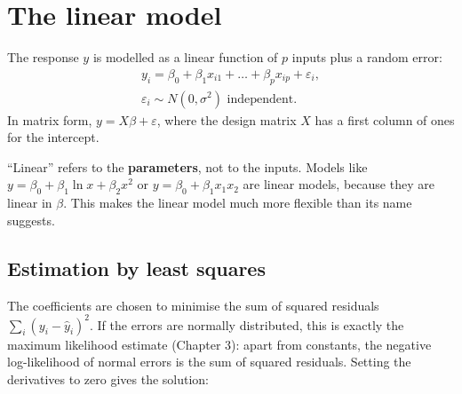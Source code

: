 \documentclass[
  letterpaper,
  DIV=11,
  numbers=noendperiod]{scrreprt}
\begin{document}
\section{The linear model}\label{the-linear-model}

\begin{tcolorbox}[enhanced jigsaw, left=2mm, title=\textcolor{quarto-callout-note-color}{\faInfo}\hspace{0.5em}{Definition: Multiple linear regression}, opacityback=0, breakable, rightrule=.15mm, arc=.35mm, toptitle=1mm, colbacktitle=quarto-callout-note-color!10!white, opacitybacktitle=0.6, coltitle=black, colframe=quarto-callout-note-color-frame, bottomrule=.15mm, leftrule=.75mm, bottomtitle=1mm, titlerule=0mm, toprule=.15mm, colback=white]

The response \(y\) is modelled as a linear function of \(p\) inputs plus
a random error:
\[\begin{gathered} y_i = \beta_0 + \beta_1 x_{i1} + \dots + \beta_p x_{ip} + \varepsilon_i, \\ \varepsilon_i \sim N(0, \sigma^2) \text{ independent}. \end{gathered}\]
In matrix form, \(y = X\beta + \varepsilon\), where the design matrix
\(X\) has a first column of ones for the intercept.

\end{tcolorbox}

``Linear'' refers to the \textbf{parameters}, not to the inputs. Models
like \(y = \beta_0 + \beta_1 \ln x + \beta_2 x^2\) or
\(y = \beta_0 + \beta_1 x_1 x_2\) are linear models, because they are
linear in \(\beta\). This makes the linear model much more flexible than
its name suggests.

\subsection{Estimation by least
squares}\label{estimation-by-least-squares}

The coefficients are chosen to minimise the sum of squared residuals
\(\sum_i (y_i - \hat y_i)^2\). If the errors are normally distributed,
this is exactly the maximum likelihood estimate (Chapter 3): apart from
constants, the negative log-likelihood of normal errors is the sum of
squared residuals. Setting the derivatives to zero gives the solution:
\end{document}
